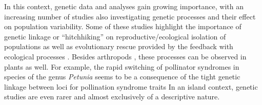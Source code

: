 \documentclass[a4paper]{scrartcl}
\begin{document}
In this context, genetic data and analyses gain growing importance,
with an increasing number of studies also investigating genetic processes and
their effect on population variability. %
Some of these studies highlight the importance of genetic linkage or ``hitchhiking'' on reproductive/ecological isolation of populations \cite{hawthorneGeneticLinkageEcological2001}\cite{viaGeneticMosaicSuggests2008}%
as well as evolutionary rescue provided by the feedback with ecological processes \cite{schiffersLimitedEvolutionaryRescue2012}.
Besides arthropods \cite{hawthorneGeneticLinkageEcological2001}, these processes can be observed in plants as well. %
For example, the rapid switching of pollinator syndromes in species of the genus \textit{Petunia} %
seems to be a consequence of the tight genetic linkage between loci for pollination syndrome traits \cite{hermannTightGeneticLinkage2013}
In an island context, genetic studies are even rarer and almost exclusively of a descriptive nature.
\end{document}
